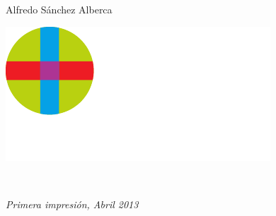 \documentclass[11pt,openright]{book}%
\begin{document}
\begin{titlepage}
{Alfredo Sánchez Alberca \\ 
} \par %
\vspace{1cm}
\includegraphics[scale=1]{img/logo_uspceu_blanco}
\end{titlepage}

\newpage
~\vfill
\thispagestyle{empty}

\smallskip
\noindent \textit{Primera impresión, Abril 2013} %

\thispagestyle{empty} %
\tableofcontents %
\cleardoublepage %



%
%
%
%
%
%
%
%
%
% 
% 
%
%
%
\end{document}
